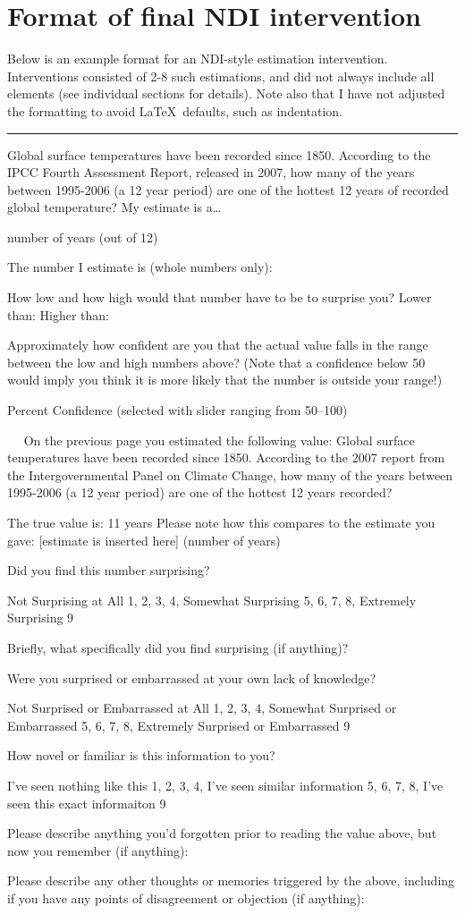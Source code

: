 \chapter{Format of final NDI intervention}
\label{chap:format-ndi}

Below is an example format for an NDI-style estimation intervention.
Interventions consisted of 2-8 such estimations, and did not always include all
elements (see individual sections for details). Note also that I have not
adjusted the formatting to avoid \LaTeX\ defaults, such as indentation. 
\hrule
Global surface temperatures have been recorded since 1850. According to the IPCC
Fourth Assessment Report, released in 2007, how many of the years between
1995-2006 (a 12 year period) are one of the hottest 12 years of recorded global
temperature? My estimate is a…

number of years (out of 12)

The number I estimate is (whole numbers only):

How low and how high would that number have to be to surprise you?
Lower than: 
Higher than:

Approximately how confident are you that the actual value falls in the range
between the low and high numbers above? (Note that a confidence below 50 would
imply you think it is more likely that the number is outside your range!)

\underline{\hspace{3cm}} Percent Confidence (selected with slider ranging from
50–100)

 
On the previous page you estimated the following value:  Global surface
temperatures have been recorded since 1850. According to the 2007 report from
the Intergovernmental Panel on Climate Change, how many of the years between
1995-2006 (a 12 year period) are one of the hottest 12 years recorded?

The true value is: 11 years  Please note how this compares to the estimate you
gave: [estimate is inserted here] (number of years)

Did you find this number surprising?

Not Surprising at All 1, 2, 3, 4, Somewhat Surprising 5, 6, 7, 8, Extremely
Surprising 9

Briefly, what specifically did you find surprising (if anything)?

Were you surprised or embarrassed at your own lack of knowledge?

Not Surprised or Embarrassed at All 1, 2, 3, 4, Somewhat Surprised or
Embarrassed 5, 6, 7, 8, Extremely Surprised or Embarrassed 9

How novel or familiar is this information to you?

I've seen nothing like this 1, 2, 3, 4, I've seen similar information 5, 6, 7,
8, I've seen this exact informaiton 9 

Please describe anything you'd forgotten prior to reading the value above, but
now you remember (if anything):

Please describe any other thoughts or memories triggered by the above, including
if you have any points of disagreement or objection (if anything):
